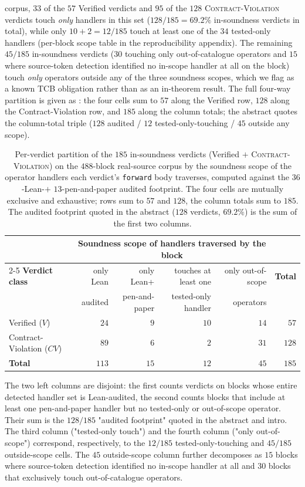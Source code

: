 corpus, $33$ of the $57$ Verified verdicts and $95$ of the $128$
\textsc{Contract-Violation} verdicts touch \emph{only} handlers
in this set ($128/185 = 69.2\%$ in-soundness verdicts in total),
while only $10+2=12/185$ touch at least one of the $34$ tested-only
handlers (per-block scope table in the reproducibility appendix). The
remaining $45/185$ in-soundness verdicts ($30$ touching only
out-of-catalogue operators and $15$ where source-token detection
identified no in-scope handler at all on the block) touch
\emph{only} operators outside any of the three soundness scopes,
which we flag as a known
TCB obligation rather than as an in-theorem result.
The full four-way partition is given as
: the four cells sum to $57$
along the Verified row, $128$ along the Contract-Violation row, and
$185$ along the column totals; the abstract quotes the
column-total triple ($128$ audited / $12$ tested-only-touching /
$45$ outside any scope).

\begin{table}[h]
\centering\small\setlength{\tabcolsep}{6pt}
\caption{Per-verdict partition of the $185$ in-soundness
verdicts (Verified $+$ \textsc{Contract-Violation}) on the
$488$-block real-source corpus by the soundness scope of the
operator handlers each verdict's \texttt{forward} body
traverses, computed against the $36$-Lean-$+$ $13$-pen-and-paper
audited footprint. The four cells are
mutually exclusive and exhaustive; rows sum to $57$ and $128$,
the column totals sum to $185$. The audited footprint quoted
in the abstract ($128$ verdicts, $69.2\%$) is the sum of the
first two columns.}
\label{tab:soundness-footprint-185}
\begin{tabular}{lrrrrr}
\toprule
 & \multicolumn{4}{c}{Soundness scope of handlers traversed by the block} & \\
\cmidrule(lr){2-5}
\textbf{Verdict class} & only Lean & only Lean+ & touches at least one & only out-of-scope & \textbf{Total} \\
 & audited & pen-and-paper & tested-only handler & operators & \\
\midrule
Verified ($V$)               & $24$ & $\;\;9$ & $10$ & $14$ & $\;\;57$ \\
Contract-Violation ($CV$)    & $89$ & $\;\;6$ & $\;\;2$ & $31$ & $128$ \\
\midrule
\textbf{Total}               & $113$ & $15$ & $12$ & $45$ & $185$ \\
\bottomrule
\end{tabular}
\end{table}
\noindent The two left columns are disjoint: the first counts
verdicts on blocks whose entire detected handler set is
Lean-audited, the second counts blocks that include at least one
pen-and-paper handler but no tested-only or out-of-scope
operator. Their sum is the $128/185$ "audited footprint" quoted
in the abstract and intro. The third column ("tested-only
touch") and the fourth column ("only out-of-scope")
correspond, respectively, to the $12/185$ tested-only-touching
and $45/185$ outside-scope cells. The $45$ outside-scope
column further decomposes as $15$ blocks where source-token
detection identified no in-scope handler at all and $30$ blocks
that exclusively touch out-of-catalogue operators.

